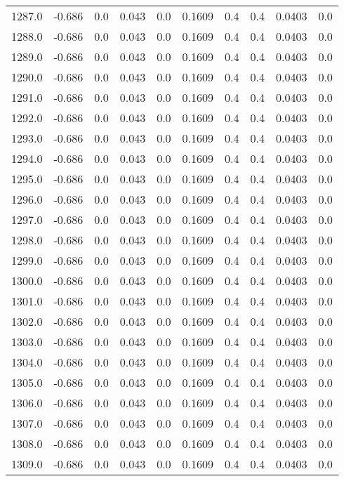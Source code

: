 \begin{longtable}{lrrrrrrrrr}
1287.0 & -0.686 & 0.0 & 0.043 & 0.0 & 0.1609 & 0.4 & 0.4 & 0.0403 & 0.0 \\
1288.0 & -0.686 & 0.0 & 0.043 & 0.0 & 0.1609 & 0.4 & 0.4 & 0.0403 & 0.0 \\
1289.0 & -0.686 & 0.0 & 0.043 & 0.0 & 0.1609 & 0.4 & 0.4 & 0.0403 & 0.0 \\
1290.0 & -0.686 & 0.0 & 0.043 & 0.0 & 0.1609 & 0.4 & 0.4 & 0.0403 & 0.0 \\
1291.0 & -0.686 & 0.0 & 0.043 & 0.0 & 0.1609 & 0.4 & 0.4 & 0.0403 & 0.0 \\
1292.0 & -0.686 & 0.0 & 0.043 & 0.0 & 0.1609 & 0.4 & 0.4 & 0.0403 & 0.0 \\
1293.0 & -0.686 & 0.0 & 0.043 & 0.0 & 0.1609 & 0.4 & 0.4 & 0.0403 & 0.0 \\
1294.0 & -0.686 & 0.0 & 0.043 & 0.0 & 0.1609 & 0.4 & 0.4 & 0.0403 & 0.0 \\
1295.0 & -0.686 & 0.0 & 0.043 & 0.0 & 0.1609 & 0.4 & 0.4 & 0.0403 & 0.0 \\
1296.0 & -0.686 & 0.0 & 0.043 & 0.0 & 0.1609 & 0.4 & 0.4 & 0.0403 & 0.0 \\
1297.0 & -0.686 & 0.0 & 0.043 & 0.0 & 0.1609 & 0.4 & 0.4 & 0.0403 & 0.0 \\
1298.0 & -0.686 & 0.0 & 0.043 & 0.0 & 0.1609 & 0.4 & 0.4 & 0.0403 & 0.0 \\
1299.0 & -0.686 & 0.0 & 0.043 & 0.0 & 0.1609 & 0.4 & 0.4 & 0.0403 & 0.0 \\
1300.0 & -0.686 & 0.0 & 0.043 & 0.0 & 0.1609 & 0.4 & 0.4 & 0.0403 & 0.0 \\
1301.0 & -0.686 & 0.0 & 0.043 & 0.0 & 0.1609 & 0.4 & 0.4 & 0.0403 & 0.0 \\
1302.0 & -0.686 & 0.0 & 0.043 & 0.0 & 0.1609 & 0.4 & 0.4 & 0.0403 & 0.0 \\
1303.0 & -0.686 & 0.0 & 0.043 & 0.0 & 0.1609 & 0.4 & 0.4 & 0.0403 & 0.0 \\
1304.0 & -0.686 & 0.0 & 0.043 & 0.0 & 0.1609 & 0.4 & 0.4 & 0.0403 & 0.0 \\
1305.0 & -0.686 & 0.0 & 0.043 & 0.0 & 0.1609 & 0.4 & 0.4 & 0.0403 & 0.0 \\
1306.0 & -0.686 & 0.0 & 0.043 & 0.0 & 0.1609 & 0.4 & 0.4 & 0.0403 & 0.0 \\
1307.0 & -0.686 & 0.0 & 0.043 & 0.0 & 0.1609 & 0.4 & 0.4 & 0.0403 & 0.0 \\
1308.0 & -0.686 & 0.0 & 0.043 & 0.0 & 0.1609 & 0.4 & 0.4 & 0.0403 & 0.0 \\
1309.0 & -0.686 & 0.0 & 0.043 & 0.0 & 0.1609 & 0.4 & 0.4 & 0.0403 & 0.0 \\

\end{longtable}

